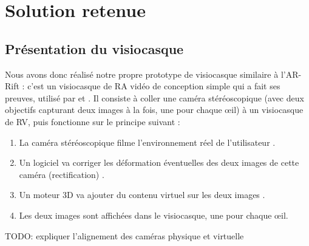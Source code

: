 \section{Solution retenue}
\subsection{Présentation du visiocasque}
Nous avons donc réalisé notre propre prototype de visiocasque  similaire à l'AR-Rift \citep{Steptoe2013} : c'est un visiocasque de RA vidéo de conception simple qui a fait ses preuves, utilisé par \cite{Steptoe2014} et \cite{Piumsomboon2014}. Il consiste à coller une caméra stéréoscopique (avec deux objectifs capturant deux images à la fois, une pour chaque \oe il) à un visiocasque de RV, puis fonctionne sur le principe suivant :
\begin{enumerate}
  \item La caméra stéréoscopique filme l'environnement réel de l'utilisateur .
  \item Un logiciel va corriger les déformation éventuelles des deux images de cette caméra (rectification) .
  \item Un moteur 3D va ajouter du contenu virtuel sur les deux images .
  \item Les deux images sont affichées dans le visiocasque, une pour chaque \oe il.
\end{enumerate}


TODO: expliquer l'alignement des caméras physique et virtuelle



